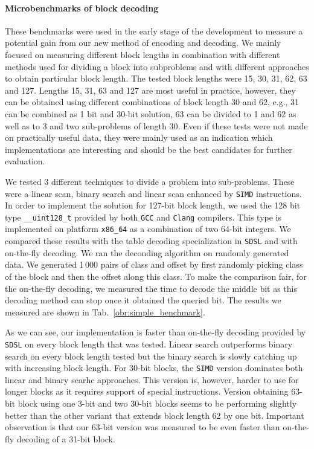 \paragraph{Microbenchmarks of block decoding}

These benchmarks were used in the early stage of the development to measure a potential gain from
our new method of encoding and decoding. We mainly focused on measuring different block lengths
in combination with different methods used for dividing a block into subproblems and with different
approaches to obtain particular block length. The tested block lengths were 15, 30, 31, 62, 63
and 127. Lengths 15, 31, 63 and 127 are most useful in practice, however, they can be obtained using
different combinations of block length 30 and 62, e.g., 31 can be combined as 1 bit and 30-bit solution,
63 can be divided to 1 and 62 as well as to 3 and two sub-problems of length 30. Even if these
tests were not made on practically useful data, they were mainly used as an indication which
implementations are interesting and should be the best candidates for further evaluation.

We tested 3 different techniques to divide a problem into sub-problems. These were a linear scan,
binary search and linear scan enhanced by \texttt{SIMD} instructions. In order to implement the
solution for 127-bit block length, we used the 128 bit type \texttt{\_\_uint128\_t} provided by both
\texttt{GCC} and \texttt{Clang} compilers. This type is implemented on platform \texttt{x86\_64}
as a combination of two 64-bit integers. We compared these results with the table decoding specialization
in \texttt{SDSL} and with on-the-fly decoding. We ran the deconding algorithm on randomly generated data.
We generated 1\,000 pairs of class and offset by first randomly picking class of the block and then the
offset along this class. To make the comparison fair, for the on-the-fly decoding, we measured the time
to decode the middle bit as this decoding method can stop once it obtained the queried bit. The results
we measured are shown in Tab.~\ref{obr:simple_benchmark}.

As we can see, our implementation is faster than on-the-fly decoding provided by \texttt{SDSL}
on every block length that was tested. Linear search outperforms binary search on
every block length tested but the binary search is slowly catching up with increasing block length.
For 30-bit blocks, the \texttt{SIMD} version dominates both linear and binary searhc approaches. This version
is, however, harder to use for longer blocks as it requires support of special instructions. Version
obtaining 63-bit block using one 3-bit and two 30-bit blocks seems to be performing slightly better than
the other variant that extends block length 62 by one bit. Important observation is that our 63-bit
version was measured to be even faster than on-the-fly decoding of a 31-bit block.

